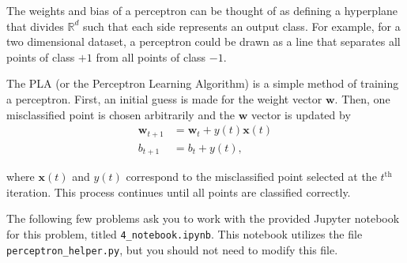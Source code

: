 The weights and bias of a perceptron can be thought of as defining a hyperplane that divides $\mathbb{R}^d$ such that each side represents an output class. For example, for a two dimensional dataset, a perceptron could be drawn as a line that separates all points of class $+1$ from all points of class $-1$.

The PLA (or the Perceptron Learning Algorithm) is a simple method of training a perceptron. First, an initial guess is made for the weight vector $\mathbf{w}$. Then, one misclassified point is chosen arbitrarily and the $\mathbf{w}$ vector is updated by
\begin{align*}
  \mathbf{w}_{t+1} &= \mathbf{w}_t + y(t)\mathbf{x}(t) \\
  b_{t + 1} &= b_t + y(t),
\end{align*}

where $\mathbf{x}(t)$ and $y(t)$ correspond to the misclassified point selected at the $t^\text{th}$ iteration.
This process continues until all points are classified correctly.

The following few problems ask you to work with the provided Jupyter notebook for this problem, titled \texttt{4_notebook.ipynb}. This notebook utilizes the file \texttt{perceptron_helper.py}, but you should not need to modify this file.

\newpage

